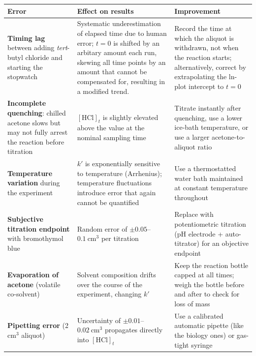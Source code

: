 \documentclass[12pt,a4paper]{article}
\begin{document}
\begin{center}
\renewcommand{\arraystretch}{1.4}
\begin{tabular}{>{\raggedright\arraybackslash}p{4.2cm}
                >{\raggedright\arraybackslash}p{4.8cm}
                >{\raggedright\arraybackslash}p{5.0cm}}
\toprule
\textbf{Error} & \textbf{Effect on results} & \textbf{Improvement} \\
\midrule
\textbf{Timing lag} between adding \textit{tert}-butyl chloride and starting the stopwatch
  & Systematic underestimation of elapsed time due to human error; $t = 0$ is shifted by an arbitary amount each run, 
  skewing all time points by an amount that cannot be compensated for, resulting in a modified trend.
  & Record the time at which the aliquot is withdrawn, not when the reaction starts;
    alternatively, correct by extrapolating the ln-plot intercept to $t = 0$ \\
\textbf{Incomplete quenching}: chilled acetone slows but may not fully arrest the reaction before titration
  & $[\text{HCl}]_t$ is slightly elevated above the value at the nominal sampling time
  & Titrate instantly after quenching, use a lower ice-bath temperature, or use a larger acetone-to-aliquot ratio\\
\textbf{Temperature variation} during the experiment
  & $k'$ is exponentially sensitive to temperature (Arrhenius); temperature fluctuations introduce error that again cannot be 
  quantified
  & Use a thermostatted water bath maintained at constant temperature throughout \\
\textbf{Subjective titration endpoint} with bromothymol blue
  & Random error of $\pm 0.05$--$0.1\ \text{cm}^3$ per titration
  & Replace with potentiometric titration (pH electrode + auto-titrator) for an objective endpoint \\
\textbf{Evaporation of acetone} (volatile co-solvent)
  & Solvent composition drifts over the course of the experiment, changing $k'$
  & Keep the reaction bottle capped at all times; weigh the bottle before and after to check for loss of mass \\
\textbf{Pipetting error} (2 cm$^3$ aliquot)
  & Uncertainty of $\pm 0.01$--$0.02\ \text{cm}^3$ propagates directly into $[\text{HCl}]_t$
  & Use a calibrated automatic pipette (like the biology ones) or gas-tight syringe \\
\bottomrule
\end{tabular}
\end{center}
\end{document}
